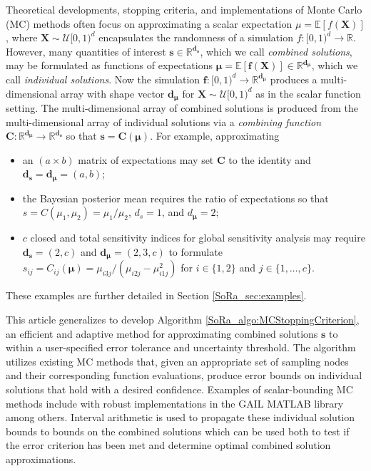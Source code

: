\documentclass[graybox]{svmult}
\begin{document}
Theoretical developments, stopping criteria, and implementations of Monte Carlo (MC) methods often focus on approximating a scalar expectation $\mu = \mathbb{E}[f(\boldsymbol{X})]$, where $\boldsymbol{X} \sim \mathcal{U}[0,1)^d$ encapsulates the randomness of a simulation $f: [0,1)^d \to \mathbb{R}$. However, many quantities of interest $\boldsymbol{s} \in \mathbb{R}^{\boldsymbol{d}_{\boldsymbol{s}}}$, which we call \emph{combined solutions}, may be formulated as functions of expectations $\boldsymbol{\mu} = \mathbb{E}[\boldsymbol{f}(\boldsymbol{X})] \in \mathbb{R}^{\boldsymbol{d}_{\boldsymbol{\mu}}}$, which we call \emph{individual solutions}. Now the simulation $\boldsymbol{f}: [0,1)^{d} \to \mathbb{R}^{\boldsymbol{d}_{\boldsymbol{\mu}}}$ produces a multi-dimensional array with shape vector $\boldsymbol{d}_{\boldsymbol{\mu}}$ for $\boldsymbol{X} \sim \mathcal{U}[0,1)^d$ as in the scalar function setting. The multi-dimensional array of combined solutions is produced from the multi-dimensional array of individual solutions via a \emph{combining function} $\boldsymbol{C}: \mathbb{R}^{\boldsymbol{d}_{\boldsymbol{\mu}}} \to \mathbb{R}^{\boldsymbol{d}_{\boldsymbol{s}}}$ so that $\boldsymbol{s} = \boldsymbol{C}(\boldsymbol{\mu})$.
For example, approximating
\begin{itemize}
    \item an $(a \times b)$ matrix of expectations may set $\boldsymbol{C}$ to the identity and $\boldsymbol{d}_{\boldsymbol{s}} = \boldsymbol{d}_{\boldsymbol{\mu}} = (a,b)$;
    \item the Bayesian posterior mean requires the ratio of expectations so that $s = C(\mu_1,\mu_2) = \mu_1/\mu_2$, $d_s = 1$, and $d_{\boldsymbol{\mu}} = 2$;
    \item $c$ closed and total sensitivity indices for global sensitivity analysis may require $\boldsymbol{d}_{\boldsymbol{s}} = (2,c)$ and $\boldsymbol{d}_{\boldsymbol{\mu}} = (2,3,c)$ to formulate $s_{ij} = C_{ij}(\boldsymbol{\mu}) =  \mu_{i3j}/(\mu_{i2j}-\mu_{i1j}^2)$ for $i \in \{1,2\}$ and $j \in \{1,\dots,c\}$.
\end{itemize}
These examples are further detailed in Section \ref{SoRa_sec:examples}.

This article generalizes \cite{adaptive_qmc} to develop Algorithm \ref{SoRa_algo:MCStoppingCriterion}, an efficient and adaptive method for approximating combined solutions $\boldsymbol{s}$ to within a user-specified error tolerance and uncertainty threshold. The algorithm utilizes existing MC  methods that, given an appropriate set of sampling nodes and their corresponding function evaluations, produce error bounds on individual solutions that hold with a desired confidence. Examples of scalar-bounding MC methods include \cite{cubmcg,cubqmclattice,cubqmcsobol,cubqmcbayes_thesis,cubqmcbayeslattice} with robust implementations in the GAIL MATLAB library \cite{ChoEtal21a,hickernell2018monte} among others. Interval arithmetic is used to propagate these individual solution bounds to bounds on the combined solutions which can be used both to test if the error criterion has been met and determine optimal combined solution approximations. 
\end{document}
